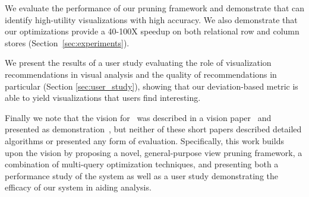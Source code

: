\begin{denselist}
  \item We evaluate the performance of our pruning framework and demonstrate that \SeeDB
  can identify high-utility visualizations with high accuracy. We also demonstrate that 
  our optimizations provide a 40-100X speedup on both relational row and column stores
  (Section~\ref{sec:experiments}). 
  \item We present the results of a user study evaluating the role of visualization 
  recommendations in visual analysis and the quality of \SeeDB recommendations in particular
  (Section \ref{sec:user_study}), showing that our deviation-based metric is able to yield visualizations that users find interesting.
\end{denselist}

Finally we note that the vision for \SeeDB\ was described in a vision paper~\cite{DBLP:conf/vldb/Parameswaran2013} and presented as demonstration~\cite{DBLP:journals/pvldb/VartakMPP14}, but neither of these short papers described detailed algorithms or
presented any form of evaluation.
Specifically, this work builds upon the \SeeDB vision by proposing a novel, general-purpose view 
pruning framework, a combination of multi-query optimization techniques, and presenting 
both a performance study of the system as well as a user study demonstrating the efficacy of our system in aiding analysis.



